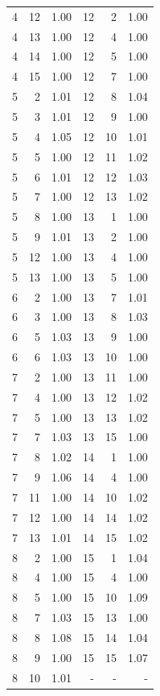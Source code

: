 \begin{table}
\begin{tabular}{|r|r|r||r|r|r|}
 4 & 12 & 1.00 & 12 & 2 & 1.00 \\
 4 & 13 & 1.00 & 12 & 4 & 1.00 \\
 4 & 14 & 1.00 & 12 & 5 & 1.00 \\
 4 & 15 & 1.00 & 12 & 7 & 1.00 \\
 5 & 2 & 1.01 & 12 & 8 & 1.04 \\
 5 & 3 & 1.01 & 12 & 9 & 1.00 \\
 5 & 4 & 1.05 & 12 & 10 & 1.01 \\
 5 & 5 & 1.00 & 12 & 11 & 1.02 \\
 5 & 6 & 1.01 & 12 & 12 & 1.03 \\
 5 & 7 & 1.00 & 12 & 13 & 1.02 \\
 5 & 8 & 1.00 & 13 & 1 & 1.00 \\
 5 & 9 & 1.01 & 13 & 2 & 1.00 \\
 5 & 12 & 1.00 & 13 & 4 & 1.00 \\
 5 & 13 & 1.00 & 13 & 5 & 1.00 \\
 6 & 2 & 1.00 & 13 & 7 & 1.01 \\
 6 & 3 & 1.00 & 13 & 8 & 1.03 \\
 6 & 5 & 1.03 & 13 & 9 & 1.00 \\
 6 & 6 & 1.03 & 13 & 10 & 1.00 \\
 7 & 2 & 1.00 & 13 & 11 & 1.00 \\
 7 & 4 & 1.00 & 13 & 12 & 1.02 \\
 7 & 5 & 1.00 & 13 & 13 & 1.02 \\
 7 & 7 & 1.03 & 13 & 15 & 1.00 \\
 7 & 8 & 1.02 & 14 & 1 & 1.00 \\
 7 & 9 & 1.06 & 14 & 4 & 1.00 \\
 7 & 11 & 1.00 & 14 & 10 & 1.02 \\
 7 & 12 & 1.00 & 14 & 14 & 1.02 \\
 7 & 13 & 1.01 & 14 & 15 & 1.02 \\
 8 & 2 & 1.00 & 15 & 1 & 1.04 \\
 8 & 4 & 1.00 & 15 & 4 & 1.00 \\
 8 & 5 & 1.00 & 15 & 10 & 1.09 \\
 8 & 7 & 1.03 & 15 & 13 & 1.00 \\
 8 & 8 & 1.08 & 15 & 14 & 1.04 \\
 8 & 9 & 1.00 & 15 & 15 & 1.07 \\
 8 & 10 & 1.01 & - & - &  - \\
 \hline
 \end{tabular}
\end{table}

